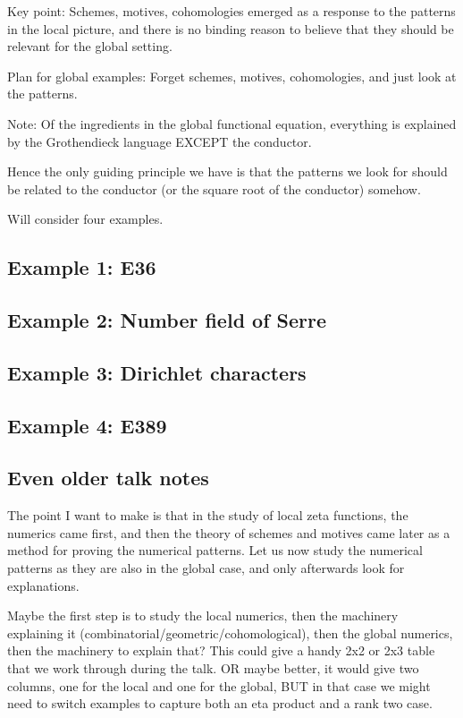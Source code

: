 \documentclass[paper=a4, fontsize=11pt]{scrartcl} %
\numberwithin{equation}{section} %
\numberwithin{figure}{section} %
\numberwithin{table}{section} %
\begin{document}
Key point: Schemes, motives, cohomologies emerged as a response to the patterns in the local picture, and there is no binding reason to believe that they should be relevant for the global setting.

Plan for global examples: Forget schemes, motives, cohomologies, and just look at the patterns.

Note: Of the ingredients in the global functional equation, everything is explained by the Grothendieck language EXCEPT the conductor.

Hence the only guiding principle we have is that the patterns we look for should be related to the conductor (or the square root of the conductor) somehow.

Will consider four examples.

\subsection{Example 1: E36}


\subsection{Example 2: Number field of Serre}


\subsection{Example 3: Dirichlet characters}


\subsection{Example 4: E389}

\subsection{Even older talk notes}

The point I want to make is that in the study of local zeta functions, the numerics came first, and then the theory of schemes and motives came later as a method for proving the numerical patterns. Let us now study the numerical patterns as they are also in the global case, and only afterwards look for explanations.

Maybe the first step is to study the local numerics, then the machinery explaining it (combinatorial/geometric/cohomological), then the global numerics, then the machinery to explain that? This could give a handy 2x2 or 2x3 table that we work through during the talk. OR maybe better, it would give two columns, one for the local and one for the global, BUT in that case we might need to switch examples to capture both an eta product and a rank two case.
\end{document}
